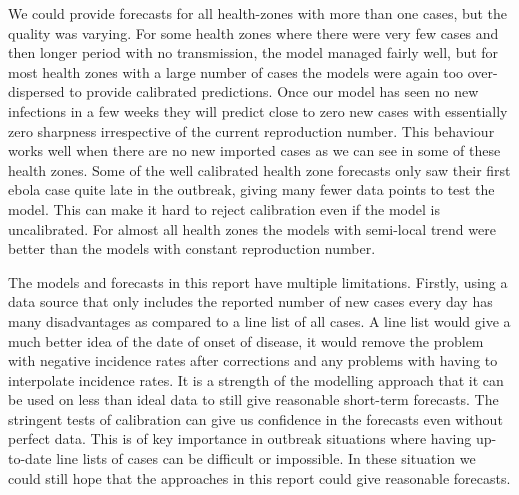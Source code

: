\documentclass[12pt]{article}
\begin{document}
We could provide forecasts for all health-zones with more than one cases, but the quality was varying. For some health zones where there were very few cases and then longer period with no transmission, the model managed fairly well, but for most health zones with a large number of cases the models were again too over-dispersed to provide calibrated predictions. Once our model has seen no new infections in a few weeks they will predict close to zero new cases with essentially zero sharpness irrespective of the current reproduction number. This behaviour works well when there are no new imported cases as we can see in some of these health zones. Some of the well calibrated health zone forecasts only saw their first ebola case quite late in the outbreak, giving many fewer data points to test the model. This can make it hard to reject calibration even if the model is uncalibrated. For almost all health zones the models with semi-local trend were better than the models with constant reproduction number. 



The models and forecasts in this report have multiple limitations. Firstly, using a data source that only includes the reported number of new cases every day has many disadvantages as compared to a line list of all cases. A line list would give a much better idea of the date of onset of disease, it would remove the problem with negative incidence rates after corrections and any problems with having to interpolate incidence rates. It is a strength of the modelling approach that it can be used on less than ideal data to still give reasonable short-term forecasts. The stringent tests of calibration can give us confidence in the forecasts even without perfect data. This is of key importance in outbreak situations where having up-to-date line lists of cases can be difficult or impossible. In these situation we could still hope that the approaches in this report could give reasonable forecasts. 
\end{document}

